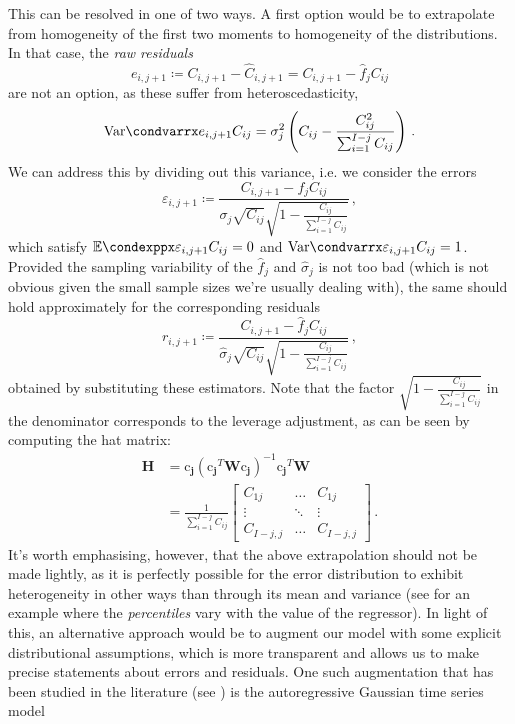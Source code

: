 \documentclass[a4paper]{book}
\begin{document}
This can be resolved in one of two ways. A first option would be to extrapolate from homogeneity of the first two moments to homogeneity of the distributions. In that case, the \emph{raw residuals}
\begin{equation}
  e_{i, j + 1} \coloneqq C_{i, j + 1} - \widehat{C}_{i, j + 1} = C_{i, j + 1} - \widehat{f}_j C_{ij}
\end{equation}
are not an option, as these suffer from heteroscedasticity,
\begin{equation}
  \condvarr{e_{i, j + 1}}{C_{ij}} = \sigma^2_j \left( C_{ij} - \frac{C^2_{ij}}{\sum_{i = 1}^{I - j} C_{ij}} \right) \,.
\end{equation}
We can address this by dividing out this variance, i.e. we consider the errors
\begin{equation}
  \varepsilon_{i, j + 1} \coloneqq \frac{C_{i, j + 1} - f_j C_{ij}}{\sigma_j \sqrt{C_{ij}} \sqrt{1 - \frac{C_{ij}}{\sum_{i = 1}^{I - j} C_{ij}}}} \,,
\end{equation}
which satisfy $\condexpp{\varepsilon_{i, j + 1}}{C_{ij}} = 0$ and $\condvarr{\varepsilon_{i, j + 1}}{C_{ij}} = 1$. Provided the sampling variability of the $\widehat{f}_j$ and $\widehat{\sigma}_j$ is not too bad (which is not obvious given the small sample sizes we're usually dealing with), the same should hold approximately for the corresponding residuals
\begin{equation}
  r_{i, j + 1} \coloneqq \frac{C_{i, j + 1} - \widehat{f}_j C_{ij}}{\widehat{\sigma}_j \sqrt{C_{ij}} \sqrt{1 - \frac{C_{ij}}{\sum_{i = 1}^{I - j} C_{ij}}}} \,,
\end{equation}
obtained by substituting these estimators. Note that the factor $\sqrt{1 - \frac{C_{ij}}{\sum_{i = 1}^{I - j} C_{ij}}}$ in the denominator corresponds to the leverage adjustment, as can be seen by computing the hat matrix:
\begin{align}
  \mathbf{H} &= \bm{\mathrm{c}_j} (\bm{\mathrm{c}_j}^T \mathbf{W} \bm{\mathrm{c}_j})^{-1} \bm{\mathrm{c}_j}^T \mathbf{W} \\[4pt]
  &= \frac{1}{\sum_{i = 1}^{I - j} C_{ij}}
  \begin{bmatrix}
    C_{1j} & \dots & C_{1j} \\
    \vdots & \ddots & \vdots\\
    C_{I - j, j} & \dots & C_{I - j, j}
  \end{bmatrix} \,.
\end{align}
It's worth emphasising, however, that the above extrapolation should not be made lightly, as it is perfectly possible for the error distribution to exhibit heterogeneity in other ways than through its mean and variance (see \cite[114]{efron:intro} for an example where the \emph{percentiles} vary with the value of the regressor). In light of this, an alternative approach would be to augment our model with some explicit distributional assumptions, which is more transparent and allows us to make precise statements about errors and residuals. One such augmentation that has been studied in the literature (see \cite[49]{wuthrich:stochastic-reserving}) is the autoregressive Gaussian time series model
\end{document}
